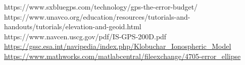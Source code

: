 \documentclass[conference,compsoc]{IEEEtran}
\begin{document}
%
%
%
\begin{thebibliography}{1}
https://www.sxbluegps.com/technology/gps-the-error-budget/
https://www.unavco.org/education/resources/tutorials-and-handouts/tutorials/elevation-and-geoid.html
https://www.navcen.uscg.gov/pdf/IS-GPS-200D.pdf
\url{https://gssc.esa.int/navipedia/index.php/Klobuchar_Ionospheric_Model}
\url{https://www.mathworks.com/matlabcentral/fileexchange/4705-error_ellipse}

\end{thebibliography}




\end{document}
